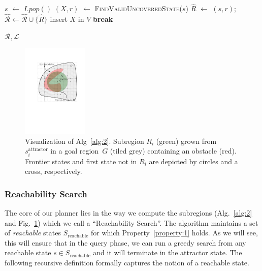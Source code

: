 \documentclass[letterpaper]{article} %
\newcommand{\calL}{\ensuremath{\mathcal{L}}\xspace}
\newcommand{\calR}{\ensuremath{\mathcal{R}}\xspace}
\newcommand{\sAttract}{\ensuremath{s^{\text{attractor}}_i}\xspace}
\begin{document}
\begin{algorithm}[t]
\begin{algorithmic}[1]
\vspace{2mm}        
        
         \label{alg:1:iv_loop}
            \State $s$ $\leftarrow$ $I.pop()$
			\If {$\nexists R \in \calR \cup \hat{\calR}$ s.t. $s \in R$ }      
\State $(X, r)$ $\leftarrow$ \textsc{FindValidUncoveredState}($s$)
                \State $\hat{R}$ $\leftarrow$ $(s,r)$;
				\hspace{2mm}
				$\hat{\calR} \leftarrow \hat{\calR} \cup \{ \hat{R} \}$   \label{alg:1:iv_region}
                    \label{alg:1:x_states}
                    \State insert $X$ in $V$
                    \State \textbf{break} \label{alg:1:break}
                \EndIf
            \EndIf
        \EndWhile
    \EndWhile

  \vspace{2mm}

  \State \Return $\calR, \calL$
\EndProcedure
\end{algorithmic}
\end{algorithm}

\begin{figure}[tb]
  \centering
  	\includegraphics[width=0.28\textwidth]{Alg2.pdf}
  \caption{
  Visualization of Alg~\ref{alg:2}. Subregion $R_i$ (green) grown from $\sAttract$ in a goal region~$G$ (tiled grey) containing an obstacle (red).
  Frontier states  and first state not in $R_i$ are depicted by circles and a cross, respectively.
}
   	\label{fig:alg2}
\end{figure}

\subsubsection{Reachability Search}
The core of our planner lies in the way we compute the subregions (Alg.~\ref{alg:2} and Fig.~\ref{fig:alg2}) which we call a ``Reachability Search''. The algorithm maintains a set of \emph{reachable} states $S_{\text{reachable}}$ for which Property~\ref{property:1} holds.
As we will see, this will ensure that in the query phase, we can run a greedy search from any reachable state $s \in S_{\text{reachable}}$ and it will terminate in the attractor state. 
%
The following recursive definition formally captures the notion of a reachable state.
\end{document}
